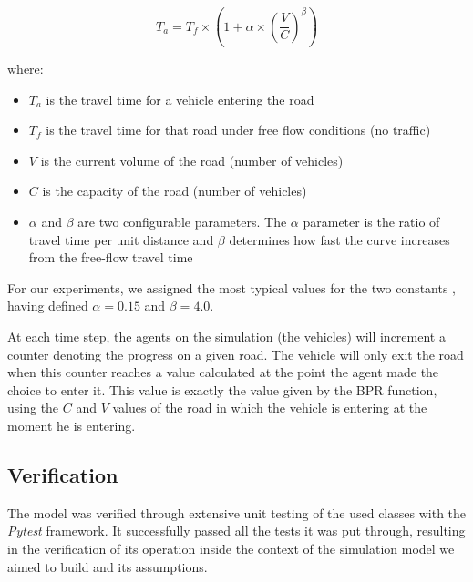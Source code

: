 \begin{equation} \label{eq:bpr}
    T_a  = T_f \times (1 + \alpha \times (\frac{V}{C})^\beta)
\end{equation}

where:

\begin{itemize}
    \item $T_a$ is the travel time for a vehicle entering the road
    \item $T_f$ is the travel time for that road under free flow conditions (no traffic)
    \item $V$ is the current volume of the road (number of vehicles)
    \item $C$ is the capacity of the road (number of vehicles)
    \item $\alpha$ and $\beta$ are two configurable parameters. The  $\alpha$ parameter is the ratio of travel time per unit distance and $\beta$ determines how fast the curve increases from the free-flow travel time \cite{anwar2011newly}
\end{itemize}

For our experiments, we assigned the most typical values for the two constants \cite{gore2023modified}, having defined $\alpha = 0.15$ and $\beta = 4.0$.

At each time step, the agents on the simulation (the vehicles) will increment a counter denoting the progress on a given road. The vehicle will only exit the road when this counter reaches a value calculated at the point the agent made the choice to enter it. This value is exactly the value given by the BPR function, using the $C$ and $V$ values of the road in which the vehicle is entering at the moment he is entering.

\subsection{Verification}

The model was verified through extensive unit testing of the used classes with the \textit{Pytest} framework. It successfully passed all the tests it was put through, resulting in the verification of its operation inside the context of the simulation model we aimed to build and its assumptions.
